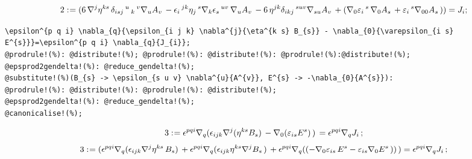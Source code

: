 \documentclass[11pt]{article}
\def\specialcolon{\mathrel{\mathop{:}}\hspace{-.5em}}
\begin{document}
\begin{dmath*}[compact, spread=2pt]
2\specialcolon{}= (6\, {\nabla}^{j}{{\eta}^{k s}}\,  {\delta}_{i s j}\,^{u}\,_{k}\,^{v} {\nabla}_{u}{{A}_{v}}\,  - {\epsilon}_{i}\,^{j k} {\eta}_{j}\,^{s} {\nabla}_{k}{{\epsilon}_{s}\,^{u v}}\,  {\nabla}_{u}{{A}_{v}}\,  - 6\, {\eta}^{j k} {\delta}_{i k j}\,^{s u v} {\nabla}_{s u}{{A}_{v}}\,  + ({\nabla}_{0}{{\varepsilon}_{i}\,^{s}}\,  {\nabla}_{0}{{A}_{s}}\,  + {\varepsilon}_{i}\,^{s} {\nabla}_{0 0}{{A}_{s}}\, )) = {J}_{i};
\end{dmath*}
{\color[named]{Blue}\begin{verbatim}
\epsilon^{p q i} \nabla_{q}{\epsilon_{i j k} \nabla^{j}{\eta^{k s} B_{s}} - \nabla_{0}{\varepsilon_{i s} E^{s}}}=\epsilon^{p q i} \nabla_{q}{J_{i}};
@prodrule!(%): @distribute!(%); @prodrule!(%): @distribute!(%): @prodrule!(%):@distribute!(%);
@epsprod2gendelta!(%): @reduce_gendelta!(%);
@substitute!(%)(B_{s} -> \epsilon_{s u v} \nabla^{u}{A^{v}}, E^{s} -> -\nabla_{0}{A^{s}}):
@prodrule!(%): @distribute!(%): @prodrule!(%): @distribute!(%);
@epsprod2gendelta!(%): @reduce_gendelta!(%);
@canonicalise!(%);
\end{verbatim}}
\begin{dmath*}[compact, spread=2pt]
3\specialcolon{}= {\epsilon}^{p q i} {\nabla}_{q}{({\epsilon}_{i j k} {\nabla}^{j}{({\eta}^{k s} {B}_{s})}\,  - {\nabla}_{0}{({\varepsilon}_{i s} {E}^{s})}\, )}\,  = {\epsilon}^{p q i} {\nabla}_{q}{{J}_{i}}\, ;
\end{dmath*}
\begin{dmath*}[compact, spread=2pt]
3\specialcolon{}= ({\epsilon}^{p q i} {\nabla}_{q}{({\epsilon}_{i j k} {\nabla}^{j}{{\eta}^{k s}}\,  {B}_{s})}\,  + {\epsilon}^{p q i} {\nabla}_{q}{({\epsilon}_{i j k} {\eta}^{k s} {\nabla}^{j}{{B}_{s}}\, )}\,  + {\epsilon}^{p q i} {\nabla}_{q}{(( - {\nabla}_{0}{{\varepsilon}_{i s}}\,  {E}^{s} - {\varepsilon}_{i s} {\nabla}_{0}{{E}^{s}}\, ))}\, ) = {\epsilon}^{p q i} {\nabla}_{q}{{J}_{i}}\, ;
\end{dmath*}
\end{document}
